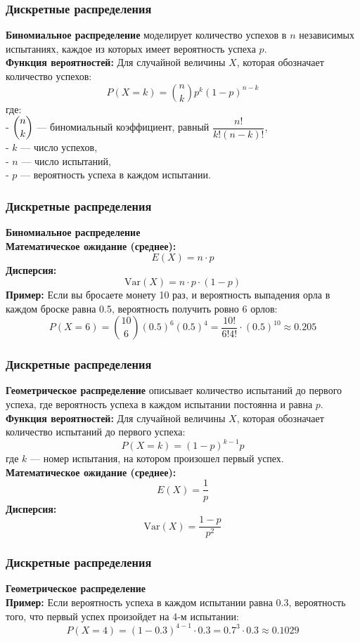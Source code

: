 \documentclass[aspectratio=169]{beamer}
\begin{document}
\begin{frame}
\frametitle{Дискретные распределения}
{\bf Биномиальное распределение} моделирует количество успехов в \( n \) независимых испытаниях, каждое из которых имеет вероятность успеха \( p \).\\
{\bf Функция вероятностей:} Для случайной величины \( X \), которая обозначает количество успехов:
  \[
  P(X = k) = \binom{n}{k} p^k (1 - p)^{n - k}
  \]
где:
\\  - \( \dbinom{n}{k} \) — биномиальный коэффициент, равный \( \dfrac{n!}{k!(n - k)!} \),
\\  - \( k \) — число успехов,
\\  - \( n \) — число испытаний,
\\  - \( p \) — вероятность успеха в каждом испытании.
\end{frame}

\begin{frame}
\frametitle{Дискретные распределения}
{\bf Биномиальное распределение}\\
{\bf Математическое ожидание (среднее):}
  \[
  E(X) = n \cdot p
  \]
{\bf Дисперсия:}
  \[
  \text{Var}(X) = n \cdot p \cdot (1 - p)
  \]
{\bf Пример:} Если вы бросаете монету 10 раз, и вероятность выпадения орла в каждом броске равна 0.5, вероятность получить ровно 6 орлов:
  \[
  P(X = 6) = \binom{10}{6} (0.5)^6 (0.5)^{4} = \frac{10!}{6!4!} \cdot (0.5)^{10} \approx 0.205
  \]
\end{frame}

\begin{frame}
\frametitle{Дискретные распределения}
{\bf Геометрическое распределение} описывает количество испытаний до первого успеха, где вероятность успеха в каждом испытании постоянна и равна \( p \).\\
{\bf Функция вероятностей:} Для случайной величины \( X \), которая обозначает количество испытаний до первого успеха:
  \[
  P(X = k) = (1 - p)^{k - 1} p
  \]
где \( k \) — номер испытания, на котором произошел первый успех.\\
{\bf Математическое ожидание (среднее):}
  \[
  E(X) = \frac{1}{p}
  \]
{\bf Дисперсия:}
  \[
  \text{Var}(X) = \frac{1 - p}{p^2}
  \]
\end{frame}

\begin{frame}
\frametitle{Дискретные распределения}
{\bf Геометрическое распределение}\\
{\bf Пример:} Если вероятность успеха в каждом испытании равна 0.3, вероятность того, что первый успех произойдет на 4-м испытании:
  \[
  P(X = 4) = (1 - 0.3)^{4 - 1} \cdot 0.3 = 0.7^3 \cdot 0.3 \approx 0.1029
  \]
\end{frame}
\end{document}
